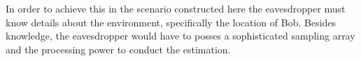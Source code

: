 \documentclass{allertonproc}
\begin{document}
In order to achieve this in the scenario constructed here the eavesdropper must know details about the environment, specifically the location of Bob. Besides knowledge, the eavesdropper would have to posses a sophisticated sampling array and the processing power to conduct the estimation.%



{}
\end{document}

